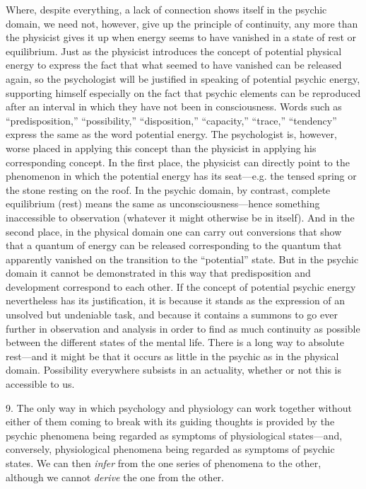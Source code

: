 \documentclass[12pt,a4paper]{book}
\newcommand{\opage}[1]{\marginnote{\footnotesize\textit{[#1]}}}
\begin{document}
Where, despite everything, a lack of connection shows itself in the
psychic domain, we need not, however, give up the principle of
continuity, any more than the physicist gives it up when energy seems to
have vanished in a state of rest or equilibrium. Just as the physicist
introduces the concept of potential physical energy to express the fact
that what seemed to have vanished can be released again, so the
psychologist will be justified in speaking of potential psychic energy,
supporting himself especially on the fact that psychic elements can be
reproduced after an interval in which they have not been in
consciousness. Words such as ``predisposition,'' ``possibility,''
``disposition,'' ``capacity,'' ``trace,'' ``tendency'' express the same
as the word potential energy. The psychologist is, however, worse placed
in applying this concept than the physicist in applying his
corresponding concept. In the first place, the physicist can directly
point to the phenomenon in which the potential energy has its seat---e.g.
the tensed spring or the stone resting on the roof. In the psychic
domain, by contrast, complete equilibrium (rest) means the same as
unconsciousness---hence something inaccessible to observation (whatever
it might otherwise be in itself). And in the second place, in the
physical domain one can carry out conversions that show that a quantum of
energy can be released corresponding to the quantum that apparently
vanished on the transition to the ``potential'' state. But in the
psychic domain it cannot be demonstrated in this way that predisposition
and development correspond to each other. If the concept of potential
psychic energy nevertheless has its justification, it is because it
stands as the expression of an unsolved but undeniable task, and because
it contains a summons to go ever further in observation and analysis in
order to find as much continuity as possible between the different states
of the mental life. There is a long way to absolute rest---and it might
be that it occurs as little in the psychic as \opage{31}in the physical domain.
Possibility everywhere subsists in an actuality, whether or not this is
accessible to us.

9. The only way in which psychology and physiology can work together
without either of them coming to break with its guiding thoughts is
provided by the psychic phenomena being regarded as symptoms of
physiological states---and, conversely, physiological phenomena being
regarded as symptoms of psychic states. We can then \emph{infer} from
the one series of phenomena to the other, although we cannot
\emph{derive} the one from the other.
\end{document}
